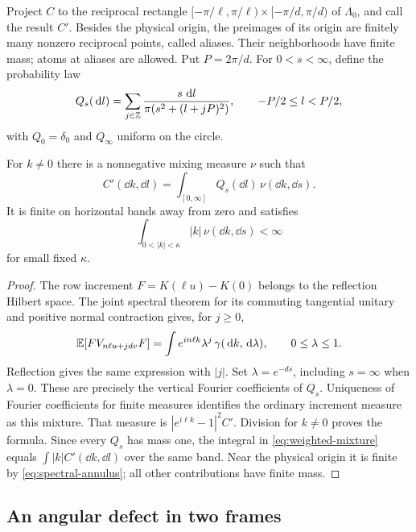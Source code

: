 Project $C$ to the reciprocal rectangle
$[-\pi/\ell,\pi/\ell)\times[-\pi/d,\pi/d)$ of $\Lambda_0$, and call the
result $C'$. Besides the physical origin, the preimages of its origin are
finitely many nonzero reciprocal points, called aliases. Their neighborhoods
have finite mass; atoms at aliases are allowed.
Put $P=2\pi/d$. For $0<s<\infty$, define the probability law
\[
 Q_s(\,\mathrm d l)=\sum_{j\in\mathbb Z}
 \frac{s\,\,\mathrm d l}{\pi(s^2+(l+jP)^2)},\qquad -P/2\le l<P/2,
\]
with $Q_0=\delta_0$ and $Q_\infty$ uniform on the circle.

\begin{lemma}
\label{lem:cauchy-mixture}
For $k\ne0$ there is a nonnegative mixing measure $\nu$ such that
\begin{equation}
 C'(\dd k,\dd l)=\int_{[0,\infty]}Q_s(\dd l)\,\nu(\dd k,\dd s).
 \label{eq:cauchy-mixture}
\end{equation}
It is finite on horizontal bands away from zero and satisfies
\begin{equation}
 \int_{0<|k|<\kappa}|k|\,\nu(\dd k,\dd s)<\infty
 \label{eq:weighted-mixture}
\end{equation}
for small fixed $\kappa$.
\end{lemma}

\begin{proof}
The row increment $F=K(\ell u)-K(0)$ belongs to the reflection Hilbert space.
The joint spectral theorem for its commuting tangential unitary and positive
normal contraction \cite[Theorem~5.6]{WilliamsSpectral2018} gives,
for $j\ge0$,
\[
 \mathbb E[F V_{n\ell u+jdv}F]
   =\int e^{in\ell k}\lambda^j\,\gamma(\,\mathrm d k,\,\mathrm d\lambda),
 \qquad 0\le\lambda\le1.
\]
Reflection gives the same expression with $|j|$. Set $\lambda=e^{-ds}$,
including $s=\infty$ when $\lambda=0$. These are precisely the vertical
Fourier coefficients of $Q_s$. Uniqueness of Fourier coefficients for finite
measures identifies the ordinary increment measure as this mixture. That
measure is $|e^{i\ell k}-1|^2C'$. Division for $k\ne0$ proves the formula.
Since every $Q_s$ has mass one, the integral in
\cref{eq:weighted-mixture} equals $\int|k|C'(\dd k,\dd l)$ over the same
band. Near the physical origin it is finite by
\cref{eq:spectral-annulus}; all other contributions have finite mass.
\end{proof}

\subsection{An angular defect in two frames}

